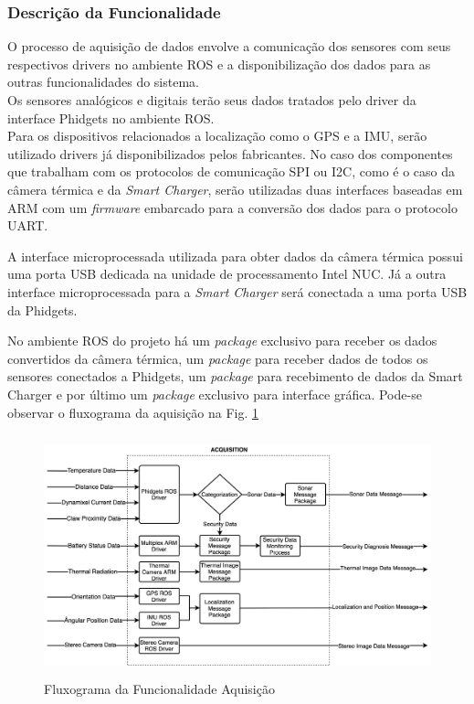 \subsubsection{Descrição da Funcionalidade}
\indent O processo de aquisição de dados envolve a comunicação dos sensores com seus respectivos drivers no ambiente ROS e a disponibilização dos dados para as outras funcionalidades do sistema.\\
\indent Os sensores analógicos e digitais terão seus dados tratados pelo driver da interface Phidgets no ambiente ROS.\\
\indent Para os dispositivos relacionados a localização como o GPS e a IMU, serão utilizado drivers já disponibilizados pelos fabricantes.
\indent No caso dos componentes que trabalham com os protocolos de comunicação SPI ou I2C, como é o caso da câmera térmica e da \textit{Smart Charger}, serão utilizadas duas interfaces baseadas em ARM com um \textit{firmware} embarcado para a conversão dos dados para o protocolo UART.

\indent A interface microprocessada utilizada para obter dados da câmera térmica possui uma porta USB dedicada na unidade de processamento Intel NUC. Já a outra interface microprocessada para a \textit{Smart Charger} será conectada a uma porta USB da Phidgets.

\indent No ambiente ROS do projeto há um \textit{package} exclusivo para receber os dados convertidos da câmera térmica, um \textit{package} para receber dados de todos os sensores conectados a Phidgets, um \textit{package} para recebimento de dados da Smart Charger e por último um \textit{package} exclusivo para interface gráfica. 
Pode-se observar o fluxograma da aquisição na Fig. \ref{FuncAquisition}

\begin{figure}[!ht]
	\centering
	\includegraphics[height=7cm, width=14cm]{Figures/Fluxograma_Aquisition.jpg}
	\caption{Fluxograma da Funcionalidade Aquisição} \label{FuncAquisition}
\end{figure}


